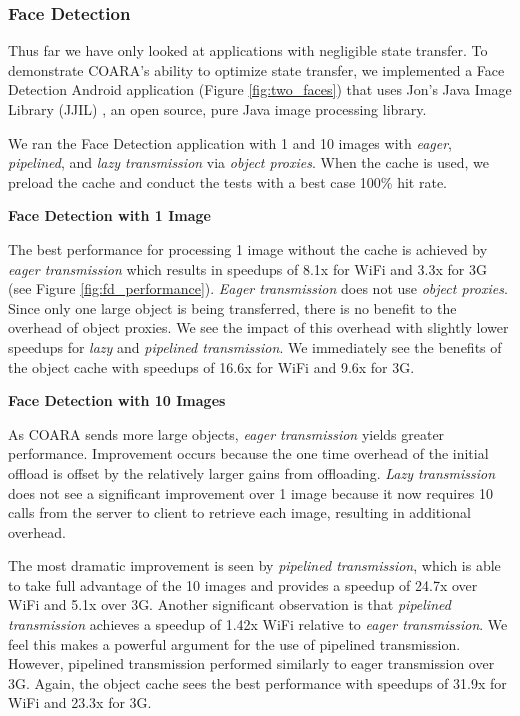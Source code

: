 \documentclass[10pt,journal,cspaper,compsoc]{IEEEtran}
\begin{document}
{\subsubsection{Face Detection}


Thus far we have only looked at applications with negligible state transfer.  To demonstrate COARA's ability to optimize state transfer, we implemented a Face Detection Android application (Figure \ref{fig:two_faces}) that uses Jon's Java Image Library (JJIL) \cite{jjil_jon:Online}, an open source, pure Java image processing library.

We ran the Face Detection application with 1 and 10 images with \emph{eager}, \emph{pipelined}, and \emph{lazy transmission} via \emph{object proxies}.  When the cache is used, we preload the cache and conduct the tests with a best case 100\% hit rate.


\textbf{Face Detection with 1 Image}

The best performance for processing 1 image without the cache is achieved by \emph{eager transmission} which results in speedups of 8.1x for WiFi and 3.3x for 3G (see Figure \ref{fig:fd_performance}).  \emph{Eager transmission} does not use \emph{object proxies}.  Since only one large object is being transferred, there is no benefit to the overhead of object proxies.  We see the impact of this overhead with slightly lower speedups for \emph{lazy} and \emph{pipelined transmission}. We immediately see the benefits of the object cache with speedups of 16.6x for WiFi and 9.6x for 3G.



\textbf{Face Detection with 10 Images}

As COARA sends more large objects, \emph{eager transmission} yields greater performance.  Improvement occurs because the one time overhead of the initial offload is offset by the relatively larger gains from offloading.  \emph{Lazy transmission} does not see a significant improvement over 1 image because it now requires 10 calls from the server to client to retrieve each image, resulting in additional overhead.

The most dramatic improvement is seen by \emph{pipelined transmission}, which is able to take full advantage of the 10 images and provides a speedup of 24.7x over WiFi and 5.1x over 3G.  Another significant observation is that \emph{pipelined transmission} achieves a speedup of 1.42x WiFi relative to \emph{eager transmission}.  We feel this makes a powerful argument for the use of pipelined transmission.  However, pipelined transmission performed similarly to eager transmission over 3G.  Again, the object cache sees the best performance with speedups of 31.9x for WiFi and 23.3x for 3G.

}
\end{document}
